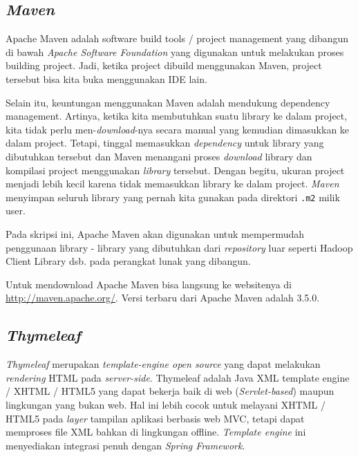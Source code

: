 
\subsection{\textit{Maven}}
\cite{MengenalMaven2015EGunawan}
Apache Maven adalah software build tools / project management yang dibangun di bawah \textit{Apache Software Foundation} yang digunakan untuk melakukan proses building project. Jadi, ketika project dibuild menggunakan Maven, project tersebut bisa kita buka menggunakan IDE lain.

Selain itu, keuntungan menggunakan Maven adalah mendukung dependency management. Artinya, ketika kita membutuhkan suatu library ke dalam project, kita tidak perlu men-\textit{download}-nya secara manual yang kemudian dimasukkan ke dalam project. Tetapi, tinggal memasukkan \textit{dependency} untuk library yang dibutuhkan tersebut dan Maven menangani proses \textit{download} library dan kompilasi project menggunakan \textit{library} tersebut.  Dengan begitu, ukuran project menjadi lebih kecil karena tidak memasukkan library ke dalam project. \textit{Maven} menyimpan seluruh library yang pernah kita gunakan pada direktori \texttt{.m2} milik user.

Pada skripsi ini, Apache Maven akan digunakan untuk mempermudah penggunaan library - library yang dibutuhkan dari \textit{repository} luar seperti Hadoop Client Library dsb. pada perangkat lunak yang dibangun.

Untuk mendownload Apache Maven bisa langsung ke websitenya di \url{http://maven.apache.org/}. Versi terbaru dari Apache Maven adalah 3.5.0.

\subsection{\textit{Thymeleaf}}
\cite{CogoluegnesIntroducing:2013} 
\textit{Thymeleaf} merupakan \textit{template-engine open source} yang dapat melakukan \textit{rendering} HTML pada \textit{server-side}. Thymeleaf adalah Java XML template engine / XHTML / HTML5 yang dapat bekerja baik di web (\textit{Servlet-based}) maupun lingkungan yang bukan web. Hal ini lebih cocok untuk melayani XHTML / HTML5 pada \textit{layer} tampilan aplikasi berbasis web MVC, tetapi dapat memproses file XML bahkan di lingkungan offline. \textit{Template engine} ini menyediakan integrasi penuh dengan \textit{Spring Framework}. 

